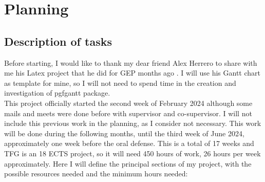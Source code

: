 \chapter{Planning}
\section{Description of tasks}
Before starting, I would like to thank my dear friend Alex Herrero to share with me his Latex project that he did for GEP months ago \cite{herrero_facultat_nodate}.
I will use his Gantt chart as template for mine, so I will not need to spend time in the creation and investigation of pgfgantt package. \\

This project officially started the second week of February 2024 although some mails and meets were done before with supervisor and co-supervisor.
I will not include this previous work in the planning, as I consider not necessary.
This work will be done during the following months, until the third week of June 2024, approximately one week before the oral defense.
This is a total of 17 weeks and TFG is an 18 ECTS project, so it will need 450 hours of work, 26 hours per week approximately.
Here I will define the principal sections of my project, with the possible resources needed and the minimum hours needed:

